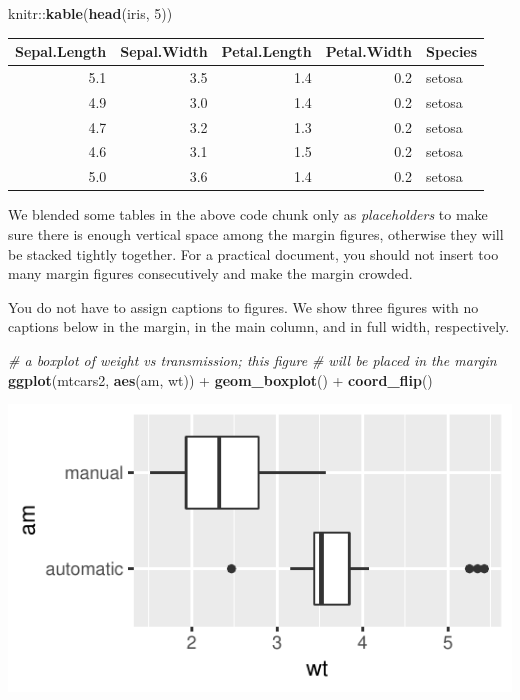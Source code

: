 \documentclass[]{tufte-handout}
\newenvironment{Shaded}{}{}
\newcommand{\CommentTok}[1]{\textcolor[rgb]{0.38,0.63,0.69}{\textit{#1}}}
\newcommand{\DecValTok}[1]{\textcolor[rgb]{0.25,0.63,0.44}{#1}}
\newcommand{\KeywordTok}[1]{\textcolor[rgb]{0.00,0.44,0.13}{\textbf{#1}}}
\newcommand{\NormalTok}[1]{#1}
\newcommand{\OperatorTok}[1]{\textcolor[rgb]{0.40,0.40,0.40}{#1}}
\newcommand{\StringTok}[1]{\textcolor[rgb]{0.25,0.44,0.63}{#1}}
\begin{document}
\begin{Shaded}
\begin{Highlighting}[]
\NormalTok{knitr}\OperatorTok{::}\KeywordTok{kable}\NormalTok{(}\KeywordTok{head}\NormalTok{(iris, }\DecValTok{5}\NormalTok{))}
\end{Highlighting}
\end{Shaded}

\begin{longtable}[]{@{}rrrrl@{}}
\toprule
Sepal.Length & Sepal.Width & Petal.Length & Petal.Width &
Species\tabularnewline
\midrule
\endhead
5.1 & 3.5 & 1.4 & 0.2 & setosa\tabularnewline
4.9 & 3.0 & 1.4 & 0.2 & setosa\tabularnewline
4.7 & 3.2 & 1.3 & 0.2 & setosa\tabularnewline
4.6 & 3.1 & 1.5 & 0.2 & setosa\tabularnewline
5.0 & 3.6 & 1.4 & 0.2 & setosa\tabularnewline
\bottomrule
\end{longtable}

We blended some tables in the above code chunk only as
\emph{placeholders} to make sure there is enough vertical space among
the margin figures, otherwise they will be stacked tightly together. For
a practical document, you should not insert too many margin figures
consecutively and make the margin crowded.

You do not have to assign captions to figures. We show three figures
with no captions below in the margin, in the main column, and in full
width, respectively.

\begin{Shaded}
\begin{Highlighting}[]
\CommentTok{# a boxplot of weight vs transmission; this figure}
\CommentTok{# will be placed in the margin}
\KeywordTok{ggplot}\NormalTok{(mtcars2, }\KeywordTok{aes}\NormalTok{(am, wt)) }\OperatorTok{+}\StringTok{ }\KeywordTok{geom_boxplot}\NormalTok{() }\OperatorTok{+}
\StringTok{  }\KeywordTok{coord_flip}\NormalTok{()}
\end{Highlighting}
\end{Shaded}

\begin{marginfigure}
\includegraphics{Epi_Notes_files/figure-latex/fig-nocap-margin-1} \end{marginfigure}
\end{document}
